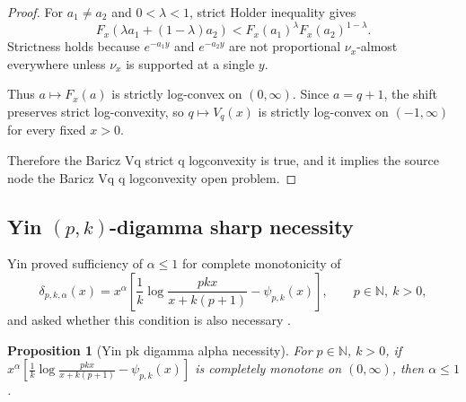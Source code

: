 \documentclass[11pt]{article}
\numberwithin{equation}{section}
\newtheorem{proposition}[theorem]{Proposition}
\theoremstyle{definition}
\theoremstyle{remark}
\newcommand{\1}{\mathbf 1}
\begin{document}
\begin{proof}
For \(a_1\ne a_2\) and \(0<\lambda<1\), strict Holder inequality gives
\[
F_x(\lambda a_1+(1-\lambda)a_2)
<
F_x(a_1)^\lambda F_x(a_2)^{1-\lambda}.
\]
Strictness holds because \(e^{-a_1y}\) and \(e^{-a_2y}\) are not proportional \(\nu_x\)-almost everywhere unless \(\nu_x\) is supported at a single \(y\).

Thus \(a\mapsto F_x(a)\) is strictly log-convex on \((0,\infty)\). Since \(a=q+1\), the shift preserves strict log-convexity, so \(q\mapsto V_q(x)\) is strictly log-convex on \((-1,\infty)\) for every fixed \(x>0\).

Therefore the Baricz Vq strict q logconvexity is true, and it implies the source node the Baricz Vq q logconvexity open problem.
\end{proof}

\subsection{Yin \((p,k)\)-digamma sharp necessity}

Yin proved sufficiency of \(\alpha\le1\) for complete monotonicity of
\begin{equation}
\label{eq:yin-pk-delta}
\delta_{p,k,\alpha}(x)
=x^\alpha\left[
\frac1k\log\frac{pkx}{x+k(p+1)}-\psi_{p,k}(x)
\right],
\qquad p\in\mathbb N,\ k>0,
\end{equation}
and asked whether this condition is also necessary \cite{yin-pk-digamma}.

\begin{proposition}[Yin pk digamma alpha necessity]
\label{res:yin-pk-digamma-alpha-necessity}
For \(p\in\mathbb N\), \(k>0\), if \(x^\alpha\left[\frac1k\log\frac{pkx}{x+k(p+1)}-\psi_{p,k}(x)\right]\) is completely monotone on \((0,\infty)\), then \(\alpha\le1\).
\end{proposition}
\end{document}
